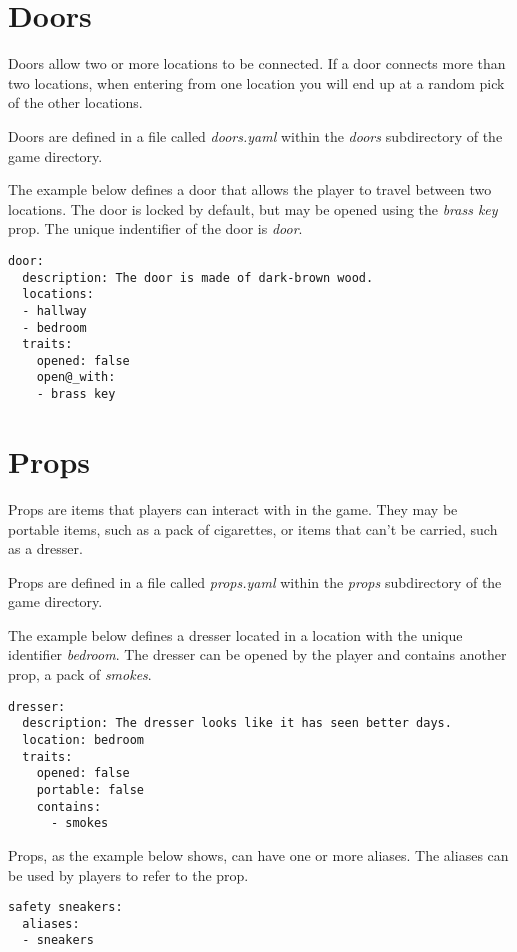 \documentclass[letterpaper,10pt,english]{sphinxmanual}
\begin{document}
\section{Doors}
\label{elements:doors}
Doors allow two or more locations to be connected. If a door connects more than two locations, when entering from one location you will end up at a random pick of the other locations.

Doors are defined in a file called \emph{doors.yaml} within the \emph{doors} subdirectory of the game directory.

The example below defines a door that allows the player to travel between two locations. The door is locked by default, but may be opened using the \emph{brass key} prop. The unique indentifier of the door is \emph{door}.

\begin{Verbatim}[commandchars=@\[\]]
door:
  description: The door is made of dark-brown wood.
  locations:
  - hallway
  - bedroom
  traits:
    opened: false
    open@_with:
    - brass key
\end{Verbatim}


\section{Props}
\label{elements:props}
Props are items that players can interact with in the game. They may be portable items, such as a pack of cigarettes, or items that can't be carried, such as a dresser.

Props are defined in a file called \emph{props.yaml} within the \emph{props} subdirectory of the game directory.

The example below defines a dresser located in a location with the unique identifier \emph{bedroom}. The dresser can be opened by the player and contains another prop, a pack of \emph{smokes}.

\begin{Verbatim}[commandchars=@\[\]]
dresser:
  description: The dresser looks like it has seen better days.
  location: bedroom
  traits:
    opened: false
    portable: false
    contains:
      - smokes
\end{Verbatim}

Props, as the example below shows, can have one or more aliases. The aliases can be used by players to refer to the prop.

\begin{Verbatim}[commandchars=@\[\]]
safety sneakers:
  aliases:
  - sneakers
\end{Verbatim}
\end{document}

